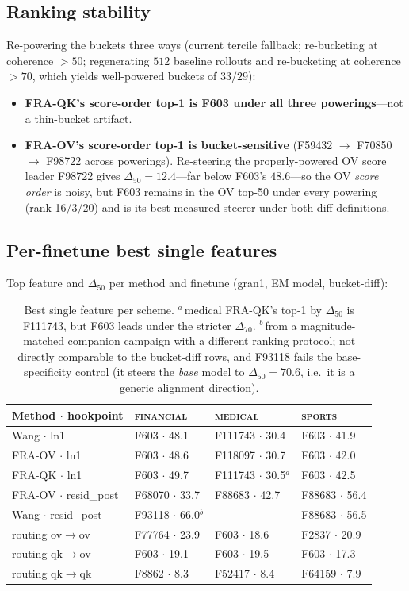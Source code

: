 \documentclass{article}
\theoremstyle{plain}
\theoremstyle{definition}
\theoremstyle{remark}
\begin{document}
\subsection{Ranking stability}
Re-powering the buckets three ways (current tercile fallback; re-bucketing at coherence $>50$; regenerating $512$ baseline rollouts and re-bucketing at coherence $>70$, which yields well-powered buckets of $33/29$):
\begin{itemize}
    \item \textbf{FRA-QK's score-order top-1 is F603 under all three powerings}---not a thin-bucket artifact.
    \item \textbf{FRA-OV's score-order top-1 is bucket-sensitive} (F59432 $\to$ F70850 $\to$ F98722 across powerings). Re-steering the properly-powered OV score leader F98722 gives $\Delta_{50} = 12.4$---far below F603's $48.6$---so the OV \emph{score order} is noisy, but F603 remains in the OV top-50 under every powering (rank 16/3/20) and is its best measured steerer under both diff definitions.
\end{itemize}

\subsection{Per-finetune best single features}
Top feature and $\Delta_{50}$ per method and finetune (gran1, EM model, bucket-diff):

\begin{table}[h]
\caption{Best single feature per scheme. $^a$\,medical FRA-QK's top-1 by $\Delta_{50}$ is F111743, but F603 leads under the stricter $\Delta_{70}$. $^b$\,from a magnitude-matched companion campaign with a different ranking protocol; not directly comparable to the bucket-diff rows, and F93118 fails the base-specificity control (it steers the \emph{base} model to $\Delta_{50} = 70.6$, i.e.\ it is a generic alignment direction).}
\label{tab:em_per_finetune}
\centering
\small
\begin{tabular}{llll}
\toprule
Method $\cdot$ hookpoint & \textsc{financial} & \textsc{medical} & \textsc{sports} \\
\midrule
Wang $\cdot$ ln1 & F603 $\cdot$ 48.1 & F111743 $\cdot$ 30.4 & F603 $\cdot$ 41.9 \\
FRA-OV $\cdot$ ln1 & F603 $\cdot$ 48.6 & F118097 $\cdot$ 30.7 & F603 $\cdot$ 42.0 \\
FRA-QK $\cdot$ ln1 & F603 $\cdot$ 49.7 & F111743 $\cdot$ 30.5$^a$ & F603 $\cdot$ 42.5 \\
FRA-OV $\cdot$ resid\_post & F68070 $\cdot$ 33.7 & F88683 $\cdot$ 42.7 & F88683 $\cdot$ 56.4 \\
Wang $\cdot$ resid\_post & F93118 $\cdot$ 66.0$^b$ & --- & F88683 $\cdot$ 56.5 \\
routing ov$\to$ov & F77764 $\cdot$ 23.9 & F603 $\cdot$ 18.6 & F2837 $\cdot$ 20.9 \\
routing qk$\to$ov & F603 $\cdot$ 19.1 & F603 $\cdot$ 19.5 & F603 $\cdot$ 17.3 \\
routing qk$\to$qk & F8862 $\cdot$ 8.3 & F52417 $\cdot$ 8.4 & F64159 $\cdot$ 7.9 \\
\bottomrule
\end{tabular}
\end{table}
\end{document}
